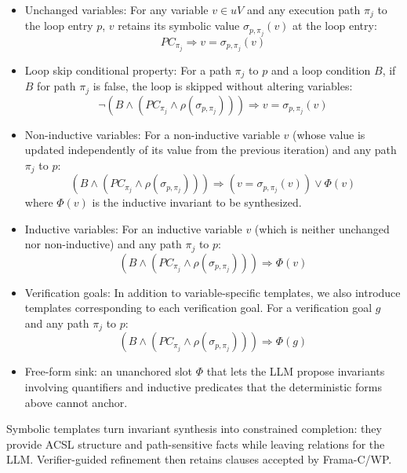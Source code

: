 \begin{itemize}
    \item Unchanged variables:
For any variable $v \in uV$ and any execution path $\pi_j$ to the loop entry $p$, $v$ retains its symbolic value $\sigma_{p, \pi_j}(v)$ at the loop entry:
\[ PC_{\pi_j} \Rightarrow v = \sigma_{p, \pi_j}(v) \]


\item Loop skip conditional property: 
For a path $\pi_j$ to $p$ and a loop condition $B$, if $B$ for path $\pi_j$ is false, the loop is skipped without altering variables:
\[{\neg (B \land (PC_{\pi_j} \land \rho(\sigma_{p, \pi_j}))) \Rightarrow v = \sigma_{p, \pi_j}(v)}\]



\item Non-inductive variables: 
For a non-inductive variable $v$ (whose value is updated independently of its value from the previous iteration) and any path $\pi_j$ to $p$:
\[{(B \land (PC_{\pi_j} \land \rho(\sigma_{p, \pi_j}))) \Rightarrow (v = \sigma_{p, \pi_j}(v)) \lor \Phi(v)}\]
where $\Phi(v)$ is the inductive invariant to be synthesized.


\item Inductive variables: 
For an inductive variable $v$ (which is neither unchanged nor non-inductive) and any path $\pi_j$ to $p$:
\[ {(B \land (PC_{\pi_j} \land \rho(\sigma_{p, \pi_j}))) \Rightarrow \Phi(v)} \]

\item Verification goals:
In addition to variable-specific templates, we also introduce templates corresponding to each verification goal.
For a verification goal $g$ and any path $\pi_j$ to $p$:
\[ {(B \land (PC_{\pi_j} \land \rho(\sigma_{p, \pi_j}))) \Rightarrow \Phi(g)}
\]

\item Free-form sink: an unanchored slot $\Phi$ that lets the LLM propose invariants involving quantifiers and inductive predicates that the deterministic forms above cannot anchor.

\end{itemize}









Symbolic templates turn invariant synthesis into constrained completion: they provide ACSL structure and path-sensitive facts while leaving relations for the LLM. Verifier-guided refinement then retains clauses accepted by Frama-C/WP.
